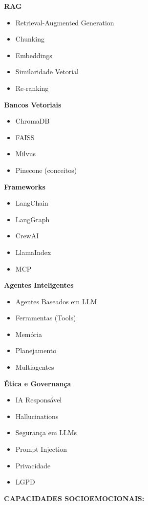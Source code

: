 \textbf{RAG}

\begin{itemize}
\item Retrieval-Augmented Generation
\item Chunking
\item Embeddings
\item Similaridade Vetorial
\item Re-ranking
\end{itemize}

\textbf{Bancos Vetoriais}

\begin{itemize}
\item ChromaDB
\item FAISS
\item Milvus
\item Pinecone (conceitos)
\end{itemize}

\textbf{Frameworks}

\begin{itemize}
\item LangChain
\item LangGraph
\item CrewAI
\item LlamaIndex
\item MCP
\end{itemize}

\textbf{Agentes Inteligentes}

\begin{itemize}
\item Agentes Baseados em LLM
\item Ferramentas (Tools)
\item Memória
\item Planejamento
\item Multiagentes
\end{itemize}

\textbf{Ética e Governança}

\begin{itemize}
\item IA Responsável
\item Hallucinations
\item Segurança em LLMs
\item Prompt Injection
\item Privacidade
\item LGPD
\end{itemize}

\textbf{CAPACIDADES SOCIOEMOCIONAIS:}

